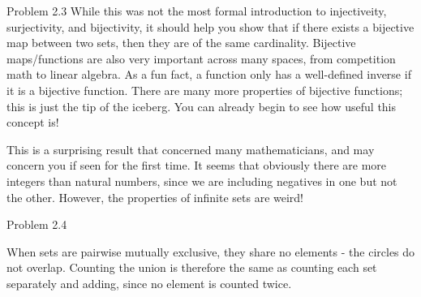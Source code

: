 \begin{sol}{Problem 2.3}
While this was not the most formal introduction to injectiveity, surjectivity, and bijectivity, it should help you show that if there exists a bijective map between two sets, then they are of the same cardinality. Bijective maps/functions are also very important across many spaces, from competition math to linear algebra. As a fun fact, a function only has a well-defined inverse if it is a bijective function. There are many more properties of bijective functions; this is just the tip of the iceberg. You can already begin to see how useful this concept is!

This is a surprising result that concerned many mathematicians, and may concern you if seen for the first time. It seems that obviously there are more integers than natural numbers, since we are including negatives in one but not the other. However, the properties of infinite sets are weird!
\end{sol}


\begin{sol}{Problem 2.4}
\begin{center}
\end{center}
When sets are pairwise mutually exclusive, they share no elements - the circles do not overlap. Counting the union is therefore the same as counting each set separately and adding, since no element is counted twice.
\end{sol}

